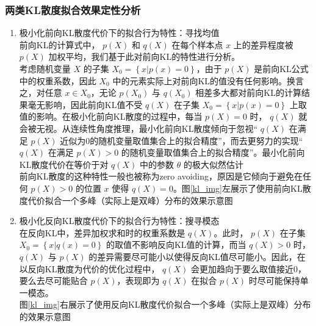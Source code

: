 \documentclass[12pt,a4paper,UTF8]{article}
\begin{document}
\subsubsection{两类KL散度拟合效果定性分析}
\begin{enumerate}
\item 极小化前向KL散度代价下的拟合行为特性：寻找均值\\
前向KL的计算式中， $p\left(X\right)$ 和 $q\left(X\right)$ 在每个样本点 $x$ 上的差异程度被 $p\left(X\right)$ 加权平均，我们基于此对前向KL的特性进行分析。\\
考虑随机变量 $X$ 的子集 $X_0=\left\{x|p\left(x\right)=0\right\}$，由于 $p\left(X\right)$ 是前向KL公式中的权重系数，因此 $X_0$ 中的元素实际上对前向KL的值没有任何影响。换言之，对任意 $x\in X_0$，无论 $p\left(X_0\right)$ 与 $q\left(X_0\right)$ 相差多大都对前向KL的计算结果毫无影响，因此前向KL值不受 $q\left(X\right)$ 在子集 $X_0=\left\{x|p\left(x\right)=0\right\}$ 上取值的影响。在极小化前向KL散度的过程中，每当 $p\left(X\right)=0$ 时， $q\left(X\right)$ 就会被无视。从连续性角度推理，最小化前向KL散度倾向于忽视“ $q\left(X\right)$ 在满足 $p\left(X\right)$ 近似为0的随机变量取值集合上的拟合精度”，而去更努力的实现“ $q\left(X\right)$ 在满足 $p\left(X\right)>0$ 的随机变量取值集合上的拟合精度”。最小化前向KL散度代价在等价于对 $q\left(X\right)$ 中的参数 $\theta$ 的极大似然估计\\
\indent 前向KL散度的这种特性一般也被称为zero avoiding，原因是它倾向于避免在任何 $p\left(X\right)>0$ 的位置 $x$ 使得 $q\left(X\right)=0$。图\ref{kl_img}左展示了使用前向KL散度代价拟合一个多峰（实际上是双峰）分布的效果示意图
\item 极小化反向KL散度代价下的拟合行为特性：搜寻模态\\
在反向KL中，差异加权求和时的权重系数是 $q\left(X\right)$。此时， $p\left(X\right)$ 在子集 $X_0=\left\{x|q\left(x\right)=0\right\}$ 的取值不影响反向KL值的计算，而当 $q\left(X\right)>0$ 时， $q\left(X\right)$ 与 $p\left(X\right)$ 的差异需要尽可能小以使得反向KL值尽可能小。因此，在以反向KL散度为代价的优化过程中， $q\left(X\right)$ 会更加趋向于要么取值接近0，要么去尽可能贴合 $p\left(X\right)$，表现即为 $q\left(X\right)$ 在拟合 $p\left(X\right)$ 时尽可能保持单一模态。\\
图\ref{kl_img}右展示了使用反向KL散度代价拟合一个多峰（实际上是双峰）分布的效果示意图


\end{enumerate}
\end{document}
